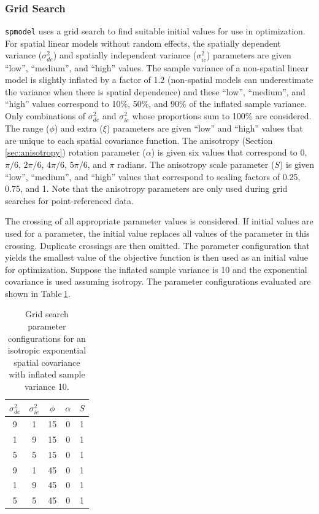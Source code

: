 \documentclass[10pt,letterpaper]{article}
\begin{document}
\hypertarget{grid-search}{%
\subsubsection{Grid Search}\label{grid-search}}

\texttt{spmodel} uses a grid search to find suitable initial values for
use in optimization. For spatial linear models without random effects,
the spatially dependent variance (\(\sigma^2_{de}\)) and spatially
independent variance (\(\sigma^2_{ie}\)) parameters are given ``low'',
``medium'', and ``high'' values. The sample variance of a non-spatial
linear model is slightly inflated by a factor of 1.2 (non-spatial models
can underestimate the variance when there is spatial dependence) and
these ``low'', ``medium'', and ``high'' values correspond to 10\%, 50\%,
and 90\% of the inflated sample variance. Only combinations of
\(\sigma^2_{de}\) and \(\sigma^2_{ie}\) whose proportions sum to 100\%
are considered. The range (\(\phi\)) and extra (\(\xi\)) parameters are
given ``low'' and ``high'' values that are unique to each spatial
covariance function. The anisotropy (Section\(~\)\ref{sec:anisotropy})
rotation parameter (\(\alpha\)) is given six values that correspond to
0, \(\pi/6\), \(2\pi/6\), \(4\pi/6\), \(5\pi/6\), and \(\pi\) radians.
The anisotropy scale parameter (\(S\)) is given ``low'', ``medium'', and
``high'' values that correspond to scaling factors of 0.25, 0.75, and 1.
Note that the anisotropy parameters are only used during grid searches
for point-referenced data.

The crossing of all appropriate parameter values is considered. If
initial values are used for a parameter, the initial value replaces all
values of the parameter in this crossing. Duplicate crossings are then
omitted. The parameter configuration that yields the smallest value of
the objective function is then used as an initial value for
optimization. Suppose the inflated sample variance is 10 and the
exponential covariance is used assuming isotropy. The parameter
configurations evaluated are shown in Table\(~\)\ref{tab:grid1}.

\begin{table}
  \centering
  \begin{tabular}{ccccc}
  \hline
  $\sigma^2_{de}$ & $\sigma^2_{ie}$ & $\phi$ & $\alpha$ & $S$ \\
  \hline
  9 & 1 & 15 & 0 & 1 \\
  1 & 9 & 15 & 0 & 1 \\
  5 & 5 & 15 & 0 & 1 \\
  9 & 1 & 45 & 0 & 1 \\
  1 & 9 & 45 & 0 & 1 \\
  5 & 5 & 45 & 0 & 1 \\
  \hline
  \end{tabular}
  \caption{Grid search parameter configurations for an isotropic exponential spatial covariance with inflated sample variance 10.}
  \label{tab:grid1}
\end{table}
\end{document}
